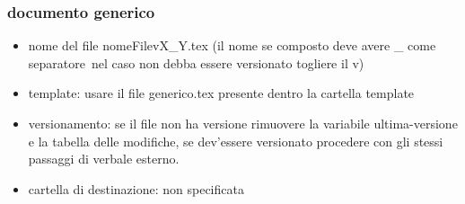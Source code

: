 \documentclass[a4paper, 12pt]{article}
\begin{document}
    \subsubsection{documento generico}
    \begin{itemize}
        \item nome del file\: nomeFile\-vX\_Y.tex (il nome se composto deve avere \_ come separatore\, nel caso non debba essere versionato togliere il \-v)
        \item template: usare il file generico.tex presente dentro la cartella template
        \item versionamento: se il file non ha versione rimuovere la variabile ultima-versione e la tabella delle modifiche, se dev'essere versionato procedere con gli stessi passaggi di verbale esterno.
        \item cartella di destinazione: non specificata
    \end{itemize}
    
    
\end{document}
